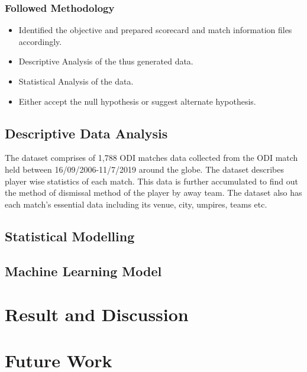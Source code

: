 \documentclass[fleqn,10pt]{wlscirep}
\begin{document}
\subsubsection{Followed Methodology}
\begin{itemize}
    \item Identified the objective and prepared scorecard and match information files accordingly.
    \item Descriptive Analysis of the thus generated data.
    \item Statistical Analysis of the data.
    \item Either accept the null hypothesis or suggest alternate hypothesis.
\end{itemize}

\subsection{Descriptive Data Analysis}
The dataset comprises of 1,788 ODI matches data collected from the ODI match held between 16/09/2006-11/7/2019 around the globe. 
The dataset describes player wise statistics of each match. This data is further accumulated to find out the 
method of dismissal method of the player by away team. 
The dataset also has each match's essential data including its venue, city, umpires, teams etc.
\subsection{Statistical Modelling}
\subsection{Machine Learning Model}
\section{Result and Discussion}
\section{Future Work}
\appendix
\end{document}
